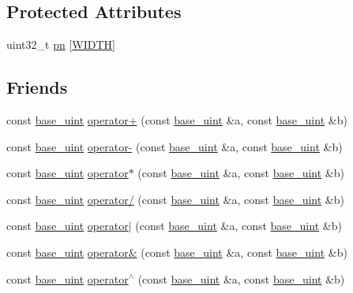\subsection*{Protected Attributes}
\begin{DoxyCompactItemize}
\item 
uint32\+\_\+t \hyperlink{classbase__uint_a0edb1465d540fadd92b21659f27083a2}{pn} \mbox{[}\hyperlink{classbase__uint_afee51629f03ba95d823ab4ee94cf6c81adf579395d753e2d9607ecd61424f0853}{W\+I\+D\+T\+H}\mbox{]}
\end{DoxyCompactItemize}
\subsection*{Friends}
\begin{DoxyCompactItemize}
\item 
const \hyperlink{classbase__uint}{base\+\_\+uint} \hyperlink{classbase__uint_ab46abc7a4c02bbbe6ee4d44db58f36fd}{operator+} (const \hyperlink{classbase__uint}{base\+\_\+uint} \&a, const \hyperlink{classbase__uint}{base\+\_\+uint} \&b)
\item 
const \hyperlink{classbase__uint}{base\+\_\+uint} \hyperlink{classbase__uint_a42603f675219a79c1087da39677dd6d3}{operator-\/} (const \hyperlink{classbase__uint}{base\+\_\+uint} \&a, const \hyperlink{classbase__uint}{base\+\_\+uint} \&b)
\item 
const \hyperlink{classbase__uint}{base\+\_\+uint} \hyperlink{classbase__uint_a7cc93af608b4d2b8e45f8a18bb085cf0}{operator$\ast$} (const \hyperlink{classbase__uint}{base\+\_\+uint} \&a, const \hyperlink{classbase__uint}{base\+\_\+uint} \&b)
\item 
const \hyperlink{classbase__uint}{base\+\_\+uint} \hyperlink{classbase__uint_a3027097ea3718db496e486d5c64a6bbd}{operator/} (const \hyperlink{classbase__uint}{base\+\_\+uint} \&a, const \hyperlink{classbase__uint}{base\+\_\+uint} \&b)
\item 
const \hyperlink{classbase__uint}{base\+\_\+uint} \hyperlink{classbase__uint_af11d7776598f6633c139636314f065d6}{operator$\vert$} (const \hyperlink{classbase__uint}{base\+\_\+uint} \&a, const \hyperlink{classbase__uint}{base\+\_\+uint} \&b)
\item 
const \hyperlink{classbase__uint}{base\+\_\+uint} \hyperlink{classbase__uint_a7dd38f6935c35d4b534b669c3baf21a6}{operator\&} (const \hyperlink{classbase__uint}{base\+\_\+uint} \&a, const \hyperlink{classbase__uint}{base\+\_\+uint} \&b)
\item 
const \hyperlink{classbase__uint}{base\+\_\+uint} \hyperlink{classbase__uint_aa9c66282ad78846e8310984aeb2df49d}{operator$^\wedge$} (const \hyperlink{classbase__uint}{base\+\_\+uint} \&a, const \hyperlink{classbase__uint}{base\+\_\+uint} \&b)

\end{DoxyCompactItemize}
